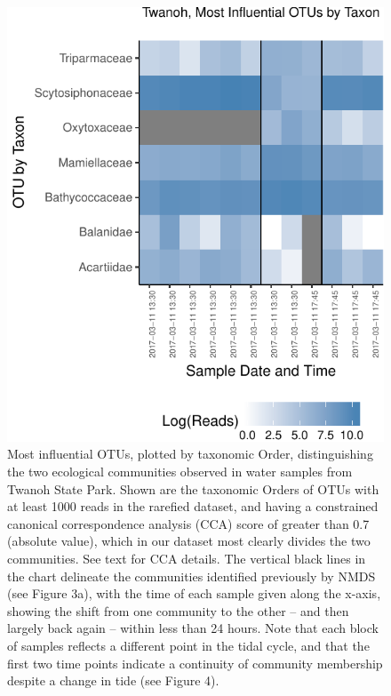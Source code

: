 \documentclass[fleqn,10pt,lineno]{wlpeerj} %
\begin{document}
\begin{figure}

{\centering \includegraphics{figures/TW_Order_turnover-1} 

}

\caption{\label{fig:fig7}Most influential OTUs, plotted by taxonomic Order, distinguishing the two ecological communities observed in water samples from Twanoh State Park. Shown are the taxonomic Orders of OTUs with at least 1000 reads in the rarefied dataset, and having a constrained canonical correspondence analysis (CCA) score of greater than 0.7 (absolute value), which in our dataset most clearly divides the two communities. See text for CCA details. The vertical black lines in the chart delineate the communities identified previously by NMDS (see Figure 3a), with the time of each sample given along the x-axis, showing the shift from one community to the other -- and then largely back again -- within less than 24 hours. Note that each block of samples reflects a different point in the tidal cycle, and that the first two time points indicate a continuity of community membership despite a change in tide (see Figure 4).}\label{fig:TW_Order_turnover}
\end{figure}
\end{document}

